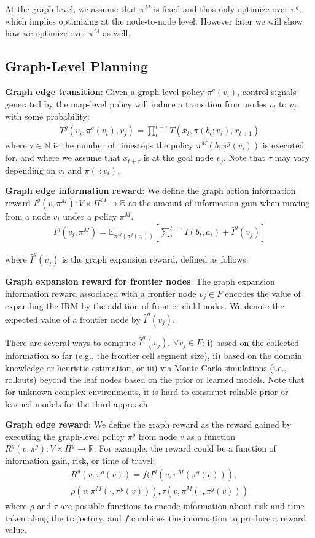 \documentclass{article}
\newcommand{\ph}[1]{{\textbf{#1}:}} %
\begin{document}
At the graph-level, we assume that $\pi^M$ is fixed and thus only optimize over $\pi^g$, which implies optimizing at the node-to-node level. However later we will show how we optimize over $\pi^M$ as well.

\subsection{Graph-Level Planning}

\ph{Graph edge transition}
Given a graph-level policy $\pi^{g}(v_i)$, control signals generated by the map-level policy will induce a  transition from nodes $v_i$ to $v_j$ with some probability:
\begin{align}
    T^{g} (v_i, \pi^g(v_i), v_j) = \prod_{t}^{t+\tau} T(x_t,\pi(b_t;v_i),x_{t+1})
\end{align}
where $\tau\in\mathbb{N}$ is the number of timesteps the policy $\pi^M(b;\pi^g(v_i))$ is executed for, and where we assume that $x_{t+\tau}$ is at the goal node $v_j$.  Note that $\tau$ may vary depending on $v_i$ and $\pi(\cdot;v_i)$.

\ph{Graph edge information reward}
We define the graph action information reward $I^g(v, \pi^M): V \times \Pi^M \to \mathbb{R}$ as the amount of information gain when moving from a node $v_i$ under a policy $\pi^M$.
\begin{align}
    I^g(v_i,\pi^M) = \mathbb{E}_{\pi^M(\pi^g(v_i))}\left[\sum_{t}^{t+\tau}  I(b_t,a_t)+\hat{I}^{g}(v_j)\right]
    \label{eq:graph_action_info_reward}
\end{align}

where $\hat{I}^{g}(v_j)$ is the graph expansion reward, defined as follows:

\ph{Graph expansion reward for frontier nodes}
The graph expansion information reward associated with a frontier node $v_j \in F$ encodes the value of expanding the IRM by the addition of frontier child nodes. We denote the expected value of a frontier node by $\hat{I}^{g}(v_j)$.

There are several ways to compute $\hat{I}^{g}(v_j)$, $\forall v_j \in F$:
i) based on the collected information so far (e.g., the frontier cell segment size),
ii) based on the domain knowledge or heuristic estimation, or
iii) via Monte Carlo simulations (i.e., rollouts) beyond the leaf nodes based on the prior or learned models.
Note that for unknown complex environments, it is hard to construct reliable prior or learned models for the third approach.

\ph{Graph edge reward}
We define the graph reward as the reward gained by executing the graph-level policy $\pi^g$ from node $v$ as a function $R^g(v, \pi^g): V \times \Pi^g \to \mathbb{R}$.  For example, the reward could be a function of information gain, risk, or time of travel:
\begin{multline}
    R^g(v, \pi^g(v)) = f(I^g(v,\pi^M(\pi^g(v))),\\
    \rho(v,\pi^M(\cdot,\pi^g(v))),\tau(v,\pi^M(\cdot,\pi^g(v)))
\end{multline}
where $\rho$ and $\tau$ are possible functions to encode information about risk and time taken along the trajectory, and $f$ combines the information to produce a reward value.
\end{document}
